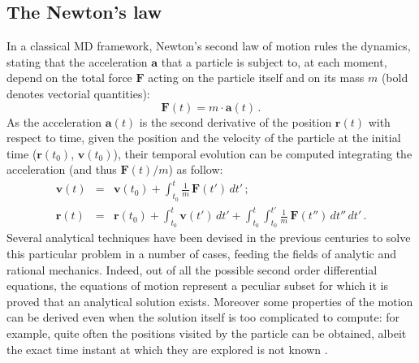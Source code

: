 \subsection{The Newton's law}
In a classical MD framework, Newton's second law of motion rules the dynamics, stating that the acceleration $\textbf{a}$ that a particle is subject to, at each moment, depend on the total force $\textbf{F}$ acting on the particle itself and on its mass $m$ (bold denotes vectorial quantities):
\begin{equation}
\textbf{F}(t) =  m \cdot \textbf{a}(t) \, .
\end{equation}
As the acceleration $\textbf{a}(t)$ is the second derivative of the position $\textbf{r}(t)$ with respect to time, given the position and the velocity of the particle at the initial time ($\textbf{r}(t_0)$, $\textbf{v}(t_0)$), their temporal evolution can be computed integrating the acceleration (and thus $\textbf{F}(t)/m$) as follow:
\begin{eqnarray} \label{eq:analytical}
\mathbf{v}(t) &=& \mathbf{v}(t_0) + \int_{t_0}^t \frac{1}{m}\,\mathbf{F}(t') \, dt' \, ; \\
\mathbf{r}(t) &=& \mathbf{r}(t_0) + \int_{t_0}^t \mathbf{v}(t') \, dt' + \int_{t_0}^t \int_{t_0}^{t'} \frac{1}{m}\,\mathbf{F}(t'') \, dt'' \, dt'\, .
\end{eqnarray}
Several analytical techniques have been devised in the previous centuries to solve this particular problem in a number of cases, feeding the fields of analytic and rational mechanics. Indeed, out of all the possible second order differential equations, the equations of motion represent a peculiar subset for which it is proved that an analytical solution exists. Moreover some properties of the motion can be derived even when the solution itself is too complicated to compute: for example, quite often the positions visited by the particle can be obtained, albeit the exact time instant at which they are explored is not known \cite{Arnold1989}.

